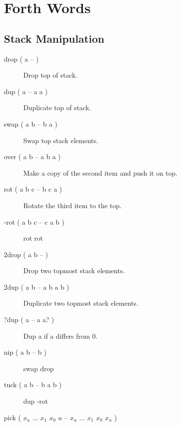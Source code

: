 \chapter{Forth Words}

\section{Stack Manipulation}

\begin{description}

\item[drop ( a -- )]

Drop top of stack.

\item[dup ( a -- a a )]

Duplicate top of stack.

\item[swap ( a b -- b a )]

Swap top stack elements.

\item[over ( a b -- a b a )]

Make a copy of the second item and push it on top.

\item[rot ( a b c -- b c a )]

Rotate the third item to the top.

\item[-rot ( a b c -- c a b )]

rot rot

\item[2drop ( a b -- )]

Drop two topmost stack elements.

\item[2dup ( a b -- a b a b )]

Duplicate two topmost stack elements.

\item[?dup ( a -- a a? )]

Dup a if a differs from 0.

\item[nip ( a b -- b )]

swap drop

\item[tuck ( a b -- b a b )]

dup -rot

\item[pick ( $x_u$ ... $x_1$ $x_0$ $u$ -- $x_u$ ... $x_1$ $x_0$ $x_u$ )]


\end{description}
